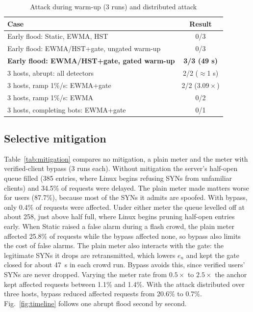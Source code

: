 \documentclass[conference]{IEEEtran}
\begin{document}
\begin{table}[t]
\centering
\caption{Attack during warm-up (3 runs) and distributed attack}
\label{tab:robust}
\setlength{\tabcolsep}{3pt}
\begin{tabular}{lc}
\toprule
Case & Result \\
\midrule
Early flood: Static, EWMA, HST & 0/3 \\
Early flood: EWMA/HST+gate, ungated warm-up & 0/3 \\
\textbf{Early flood: EWMA/HST+gate, gated warm-up} & \textbf{3/3 (49 s)} \\
\midrule
3 hosts, abrupt: all detectors & 2/2 ($\approx$1 s) \\
3 hosts, ramp 1\%/s: EWMA+gate & 2/2 ($3.09\times$) \\
3 hosts, ramp 1\%/s: EWMA & 0/2 \\
3 hosts, completing bots: EWMA+gate & 0/1 \\
\bottomrule
\end{tabular}
\end{table}

\subsection{Selective mitigation}
Table~\ref{tab:mitigation} compares no mitigation, a plain meter and the meter with verified-client bypass (3 runs each). Without mitigation the server's half-open queue filled (385 entries, where Linux begins refusing SYNs from unfamiliar clients) and 34.5\% of requests were delayed. The plain meter made matters worse for users (87.7\%), because most of the SYNs it admits are spoofed. With bypass, only 0.4\% of requests were affected. Under either meter the queue levelled off at about 258, just above half full, where Linux begins pruning half-open entries early. When Static raised a false alarm during a flash crowd, the plain meter affected 25.8\% of requests while the bypass affected none, so bypass also limits the cost of false alarms. The plain meter also interacts with the gate: the legitimate SYNs it drops are retransmitted, which lowers $e_n$ and kept the gate closed for about 47~s in each crowd run. Bypass avoids this, since verified users' SYNs are never dropped. Varying the meter rate from $0.5\times$ to $2.5\times$ the anchor kept affected requests between 1.1\% and 1.4\%. With the attack distributed over three hosts, bypass reduced affected requests from 20.6\% to 0.7\%. Fig.~\ref{fig:timeline} follows one abrupt flood second by second.
\end{document}
